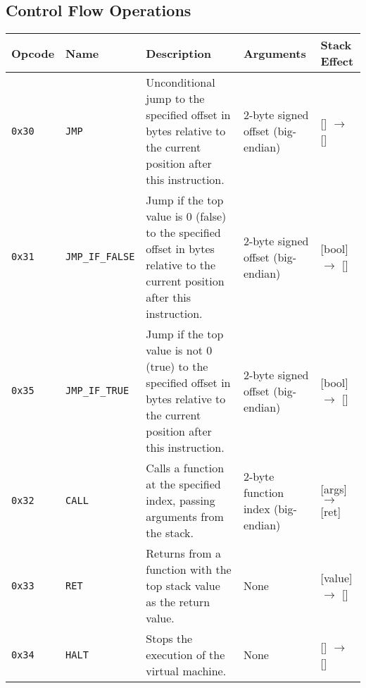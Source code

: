 \documentclass[a4paper,12pt]{article}
\begin{document}
    \subsection{Control Flow Operations}
    \begin{tabular}{|l|l|p{4cm}|l|l|}
        \hline
        \textbf{Opcode} & \textbf{Name} & \textbf{Description} & \textbf{Arguments} & \textbf{Stack Effect} \\ \hline
        \texttt{0x30} & \texttt{JMP} & Unconditional jump to the specified offset in bytes relative to the current position after this instruction. & 2-byte signed offset (big-endian) & [] $\rightarrow$ [] \\ \hline
        \texttt{0x31} & \texttt{JMP\_IF\_FALSE} & Jump if the top value is 0 (false) to the specified offset in bytes relative to the current position after this instruction. & 2-byte signed offset (big-endian) & [bool] $\rightarrow$ [] \\ \hline
        \texttt{0x35} & \texttt{JMP\_IF\_TRUE} & Jump if the top value is not 0 (true) to the specified offset in bytes relative to the current position after this instruction. & 2-byte signed offset (big-endian) & [bool] $\rightarrow$ [] \\ \hline
        \texttt{0x32} & \texttt{CALL} & Calls a function at the specified index, passing arguments from the stack. & 2-byte function index (big-endian) & [args] $\rightarrow$ [ret] \\ \hline
        \texttt{0x33} & \texttt{RET} & Returns from a function with the top stack value as the return value. & None & [value] $\rightarrow$ [] \\ \hline
        \texttt{0x34} & \texttt{HALT} & Stops the execution of the virtual machine. & None & [] $\rightarrow$ [] \\ \hline
    \end{tabular}
    \label{tab:control_flow_operations}
\end{document}
